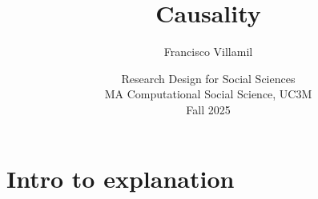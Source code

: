 \documentclass[aspectratio=43]{beamer}
\title[Lecture 3: Causality]{\Large Causality}
\author[]{Francisco Villamil}
\date[]{Research Design for Social Sciences\\MA Computational Social Science, UC3M\\Fall 2025}
\begin{document}

\begin{frame}
  \titlepage
\end{frame}

%
%

\section{Intro to explanation}



\end{document}
